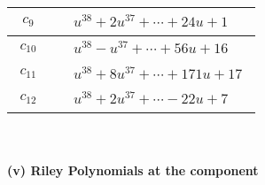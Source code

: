 \documentclass[1p]{elsarticle_modified}
\theoremstyle{definition}
\begin{document}
\begin{tabular}{m{50pt}|m{274pt}}
\hline $$\begin{aligned}c_{9}\end{aligned}$$&$\begin{aligned}
&u^{38}+2 u^{37}+\cdots+24 u+1
\end{aligned}$\\
\hline $$\begin{aligned}c_{10}\end{aligned}$$&$\begin{aligned}
&u^{38}- u^{37}+\cdots+56 u+16
\end{aligned}$\\
\hline $$\begin{aligned}c_{11}\end{aligned}$$&$\begin{aligned}
&u^{38}+8 u^{37}+\cdots+171 u+17
\end{aligned}$\\
\hline $$\begin{aligned}c_{12}\end{aligned}$$&$\begin{aligned}
&u^{38}+2 u^{37}+\cdots-22 u+7
\end{aligned}$\\
\hline
\end{tabular}\\~\\
\newpage\renewcommand{\arraystretch}{1}
\flushleft \textbf{(v) Riley Polynomials at the component}\newline \\
\end{document}
